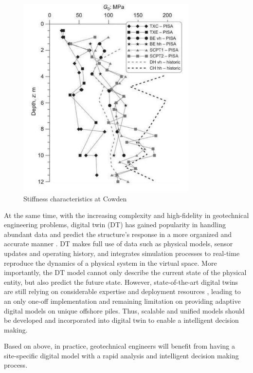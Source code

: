 \begin{figure}[H]
    \centering
    \includegraphics[width = 90mm]{Figures/figure1.pdf}
    \caption{Stiffness characteristics at Cowden \protect\citep{zdravkovic2020}}
    \label{fig:fig1.1}
\end{figure}


At the same time, with the increasing complexity and high-fidelity in geotechnical engineering problems, digital twin (DT) has gained popularity in handling abundant data and predict the structure's response in a more organized and accurate manner \citep{wang2021}. DT makes full use of data such as physical models, sensor updates and operating history, and integrates simulation processes to real-time reproduce the dynamics of a physical system in the virtual space. More importantly, the DT model cannot only describe the current state of the physical entity, but also predict the future state. However, state-of-the-art digital twins are still relying on considerable expertise and deployment resources \citep{kapteyn2021}, leading to an only one-off implementation and remaining limitation on providing adaptive digital models on unique offshore piles. Thus, scalable and unified models should be developed and incorporated into digital twin to enable a intelligent decision making.

Based on above, in practice, geotechnical engineers will benefit from having a site-specific digital model with a rapid analysis and intelligent decision making process.




















